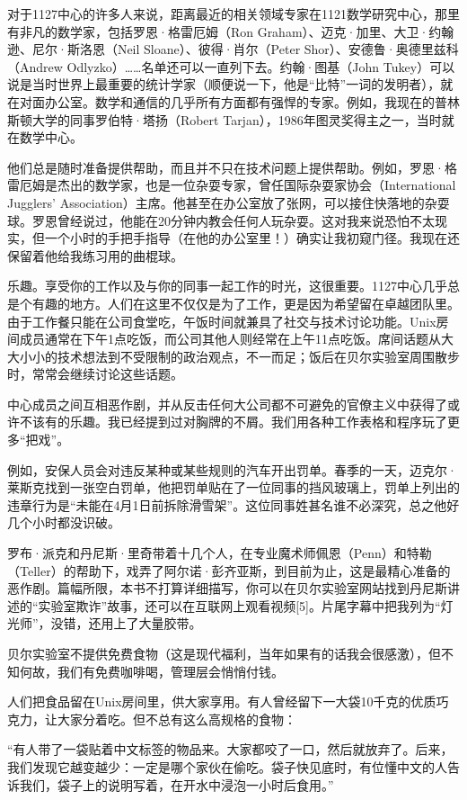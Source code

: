 \documentclass[a4paper,12pt,UTF8,twoside]{ctexbook}
\begin{document}
对于1127中心的许多人来说，距离最近的相关领域专家在1121数学研究中心，那里有非凡的数学家，包括罗恩·格雷厄姆（Ron Graham）、迈克·加里、大卫·约翰逊、尼尔·斯洛恩（Neil Sloane）、彼得·肖尔（Peter Shor）、安德鲁·奥德里兹科（Andrew Odlyzko）……名单还可以一直列下去。约翰·图基（John Tukey）可以说是当时世界上最重要的统计学家（顺便说一下，他是“比特”一词的发明者），就在对面办公室。数学和通信的几乎所有方面都有强悍的专家。例如，我现在的普林斯顿大学的同事罗伯特·塔扬（Robert Tarjan），1986年图灵奖得主之一，当时就在数学中心。

他们总是随时准备提供帮助，而且并不只在技术问题上提供帮助。例如，罗恩·格雷厄姆是杰出的数学家，也是一位杂耍专家，曾任国际杂耍家协会（International Jugglers’ Association）主席。他甚至在办公室放了张网，可以接住快落地的杂耍球。罗恩曾经说过，他能在20分钟内教会任何人玩杂耍。这对我来说恐怕不太现实，但一个小时的手把手指导（在他的办公室里！）确实让我初窥门径。我现在还保留着他给我练习用的曲棍球。

乐趣。享受你的工作以及与你的同事一起工作的时光，这很重要。1127中心几乎总是个有趣的地方。人们在这里不仅仅是为了工作，更是因为希望留在卓越团队里。由于工作餐只能在公司食堂吃，午饭时间就兼具了社交与技术讨论功能。Unix房间成员通常在下午1点吃饭，而公司其他人则经常在上午11点吃饭。席间话题从大大小小的技术想法到不受限制的政治观点，不一而足；饭后在贝尔实验室周围散步时，常常会继续讨论这些话题。

中心成员之间互相恶作剧，并从反击任何大公司都不可避免的官僚主义中获得了或许不该有的乐趣。我已经提到过对胸牌的不屑。我们用各种工作表格和程序玩了更多“把戏”。

例如，安保人员会对违反某种或某些规则的汽车开出罚单。春季的一天，迈克尔·莱斯克找到一张空白罚单，他把罚单贴在了一位同事的挡风玻璃上，罚单上列出的违章行为是“未能在4月1日前拆除滑雪架”。这位同事姓甚名谁不必深究，总之他好几个小时都没识破。

罗布·派克和丹尼斯·里奇带着十几个人，在专业魔术师佩恩（Penn）和特勒（Teller）的帮助下，戏弄了阿尔诺·彭齐亚斯，到目前为止，这是最精心准备的恶作剧。篇幅所限，本书不打算详细描写，你可以在贝尔实验室网站找到丹尼斯讲述的“实验室欺诈”故事，还可以在互联网上观看视频[5]。片尾字幕中把我列为“灯光师”，没错，还用上了大量胶带。

贝尔实验室不提供免费食物（这是现代福利，当年如果有的话我会很感激），但不知何故，我们有免费咖啡喝，管理层会悄悄付钱。

人们把食品留在Unix房间里，供大家享用。有人曾经留下一大袋10千克的优质巧克力，让大家分着吃。但不总有这么高规格的食物：

“有人带了一袋贴着中文标签的物品来。大家都咬了一口，然后就放弃了。后来，我们发现它越变越少：一定是哪个家伙在偷吃。袋子快见底时，有位懂中文的人告诉我们，袋子上的说明写着，在开水中浸泡一小时后食用。”
\end{document}
